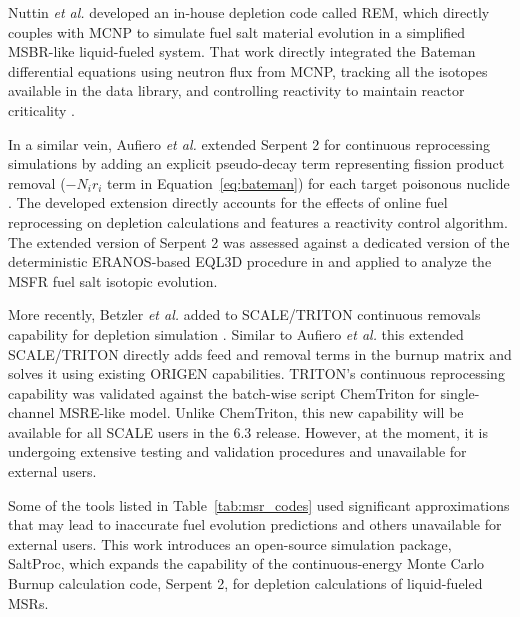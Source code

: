 Nuttin \emph{et al.} developed an in-house depletion code called \gls{REM}, 
which directly couples with \gls{MCNP} \cite{werner_mcnp_2017-1} to simulate 
fuel salt material evolution in a simplified \gls{MSBR}-like liquid-fueled 
system. That work directly integrated the Bateman differential equations using 
neutron flux from \gls{MCNP}, tracking all the isotopes available in the 
data library, and controlling reactivity to maintain reactor criticality
\cite{nuttin_potential_2005}.

In a similar vein, Aufiero \emph{et al.} extended Serpent 2 for continuous 
reprocessing simulations by adding an explicit pseudo-decay term representing 
fission product removal ($-N_i r_i$ term in Equation~\ref{eq:bateman}) for 
each target poisonous nuclide \cite{aufiero_extended_2013}. The developed 
extension directly accounts for the effects of online fuel reprocessing on 
depletion calculations and features a reactivity control algorithm. The 
extended version of Serpent 2 was assessed against a dedicated version of the 
deterministic ERANOS-based EQL3D procedure in 
\cite{fiorina_investigation_2013} and applied to analyze the \gls{MSFR} fuel 
salt isotopic evolution.

More recently, Betzler \emph{et al.} added to SCALE/TRITON continuous removals 
capability for depletion simulation \cite{betzler_molten_2019}. Similar to 
Aufiero \emph{et al.} this extended SCALE/TRITON directly adds feed and 
removal terms in the burnup matrix and solves it using existing ORIGEN 
capabilities. TRITON's continuous reprocessing capability was validated 
against the batch-wise script ChemTriton for single-channel \gls{MSRE}-like 
model. Unlike ChemTriton, this new capability will be available for all SCALE 
users in the 6.3 release. However, at the moment, it is undergoing extensive 
testing and validation procedures and unavailable for external users.

Some of the tools listed in Table~\ref{tab:msr_codes} used significant  
approximations that may lead to inaccurate fuel evolution predictions and 
others unavailable for external users. This work introduces an 
open-source simulation package, SaltProc, which expands the capability of the 
continuous-energy Monte Carlo Burnup calculation code, Serpent 2, for 
depletion calculations of liquid-fueled \glspl{MSR}.


